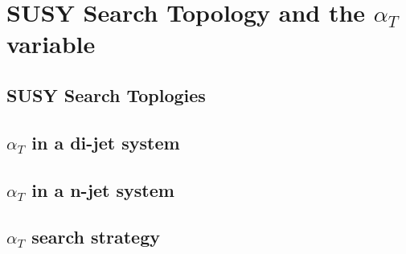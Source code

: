 \chapter{SUSY Search Topology and the $\alpha_{T}$  variable}
\section{SUSY Search Toplogies}
\section{$\alpha_{T}$ in a di-jet system}
\section{$\alpha_{T}$ in a n-jet system}
\section{$\alpha_{T}$ search strategy}

